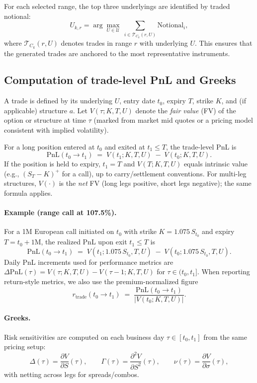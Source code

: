 \documentclass[12pt,a4paper]{report}
\begin{document}
For each selected range, the top three underlyings are identified by traded notional:
\[
    U_{k,r} = \arg\max_{U \in \mathcal{U}} \ \sum_{i \in \mathcal{T}_{C_k}(r,U)} \text{Notional}_i,
\]
where \(\mathcal{T}_{C_k}(r,U)\) denotes trades in range \(r\) with underlying \(U\). This ensures that the generated trades are anchored to the most representative instruments.


\subsection{Computation of trade-level PnL and Greeks}

A trade is defined by its underlying $U$, entry date $t_0$, expiry $T$, strike $K$, and (if applicable) structure $a$. Let $V(\tau;K,T,U)$ denote the \emph{fair value} (FV) of the option or structure at time $\tau$ (marked from market mid quotes or a pricing model consistent with implied volatility).

For a long position entered at $t_0$ and exited at $t_1\le T$, the trade-level PnL is
\[
\text{PnL}(t_0\!\to\!t_1) \;=\; V(t_1;K,T,U)\;-\;V(t_0;K,T,U).
\]
If the position is held to expiry, $t_1=T$ and $V(T;K,T,U)$ equals intrinsic value (e.g., $(S_T-K)^+$ for a call), up to carry/settlement conventions. For multi-leg structures, $V(\cdot)$ is the \emph{net} FV (long legs positive, short legs negative); the same formula applies.

\paragraph{Example (range call at 107.5\%).}
For a 1M European call initiated on $t_0$ with strike $K=1.075\,S_{t_0}$ and expiry $T=t_0+1\text{M}$, the realized PnL upon exit $t_1\le T$ is
\[
\text{PnL}(t_0\!\to\!t_1) \;=\; V(t_1;1.075\,S_{t_0},T,U)\;-\;V(t_0;1.075\,S_{t_0},T,U).
\]
Daily PnL increments used for performance metrics are $\Delta \text{PnL}(\tau)=V(\tau;K,T,U)-V(\tau\!-\!1;K,T,U)$ for $\tau\in(t_0,t_1]$. When reporting return-style metrics, we also use the premium-normalized figure
\[
r_{\text{trade}}(t_0\!\to\!t_1)\;=\;\frac{\text{PnL}(t_0\!\to\!t_1)}{\big|V(t_0;K,T,U)\big|}.
\]

\paragraph{Greeks.}
Risk sensitivities are computed on each business day $\tau\in[t_0,t_1]$ from the same pricing setup:
\[
\Delta(\tau)=\frac{\partial V}{\partial S}(\tau),\qquad
\Gamma(\tau)=\frac{\partial^2 V}{\partial S^2}(\tau),\qquad
\nu(\tau)=\frac{\partial V}{\partial \sigma}(\tau),
\]
with netting across legs for spreads/combos.
\end{document}

